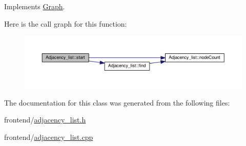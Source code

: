 Implements \hyperlink{classGraph_a7b0c57d46c652fb12e4ca65a816f7a36}{Graph}.



Here is the call graph for this function\-:
\nopagebreak
\begin{figure}[H]
\begin{center}
\leavevmode
\includegraphics[width=350pt]{classAdjacency__list_a129aec8db0fc3b6109de60f765c41ac4_cgraph}
\end{center}
\end{figure}




The documentation for this class was generated from the following files\-:\begin{DoxyCompactItemize}
\item 
frontend/\hyperlink{adjacency__list_8h}{adjacency\-\_\-list.\-h}\item 
frontend/\hyperlink{adjacency__list_8cpp}{adjacency\-\_\-list.\-cpp}\end{DoxyCompactItemize}
